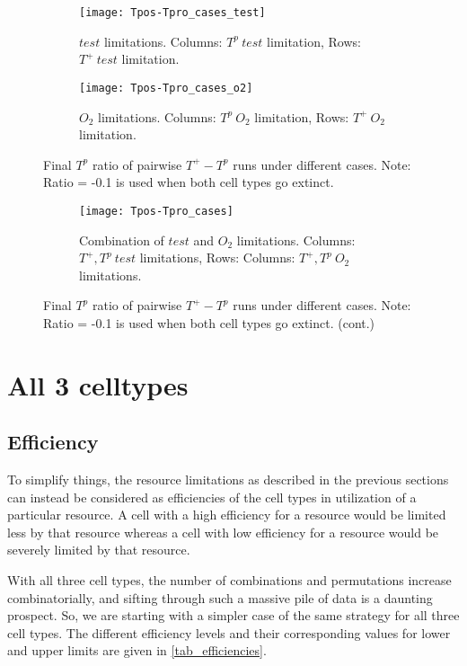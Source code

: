 \begin{figure}[h!]
  \centering
  \begin{subfigure}[b]{\textwidth}
    \centering
    \texttt{[image: Tpos-Tpro\_cases\_test]}
    \caption{$test$ limitations. Columns: $T^p\ test$ limitation, Rows: $T^+\ test$ limitation.}
    \label{fig_Tpos-Tpro_cases_test}
  \end{subfigure}
  \begin{subfigure}[b]{\textwidth}
    \centering
    \texttt{[image: Tpos-Tpro\_cases\_o2]}
    \caption{$O_2$ limitations. Columns: $T^p\ O_2$ limitation, Rows: $T^+\ O_2$ limitation.}
    \label{fig_Tpos-Tpro_cases_o2}
  \end{subfigure}
  \caption[Final $T^p$ ratio of pairwise $T^+ - T^p$ runs under different cases]{Final $T^p$ ratio of pairwise $T^+ - T^p$ runs under different cases. Note: Ratio = -0.1 is used when both cell types go extinct.}
\end{figure}
\begin{figure}[h!]\ContinuedFloat
  \begin{subfigure}[b]{\textwidth}
    \centering
    \texttt{[image: Tpos-Tpro\_cases]}
    \caption{Combination  of $test$ and $O_2$ limitations. Columns: $T^+,T^p\ test$ limitations, Rows: Columns: $T^+,T^p\ O_2$ limitations.}
    \label{fig_Tpos-Tpro_cases_combi}
  \end{subfigure}
  \caption[]{Final $T^p$ ratio of pairwise $T^+ - T^p$ runs under different cases. Note: Ratio = -0.1 is used when both cell types go extinct. (cont.)}
  \label{fig_Tpos-Tpro_cases}
\end{figure}

\newpage

\section{All 3 celltypes}
\subsection{Efficiency}
To simplify things, the resource limitations as described in the previous sections can instead be considered as efficiencies of the cell types in utilization of a particular resource. A cell with a high efficiency for a resource would be limited less by that resource whereas a cell with low efficiency for a resource would be severely limited by that resource.

With all three cell types, the number of combinations and permutations increase combinatorially, and sifting through such a massive pile of data is a daunting prospect. So, we are starting with a simpler case of the same strategy for all three cell types. The different efficiency levels and their corresponding values for lower and upper limits are given in \autoref{tab_efficiencies}.

